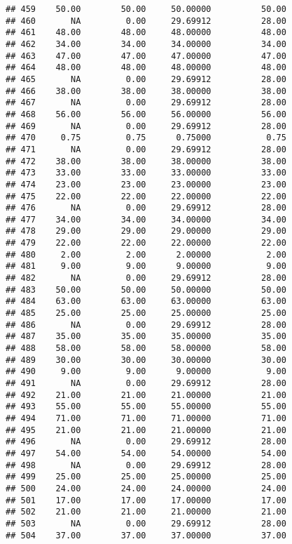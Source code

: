 \documentclass[
]{article}
\begin{document}
\begin{verbatim}
## 459    50.00        50.00     50.00000          50.00
## 460       NA         0.00     29.69912          28.00
## 461    48.00        48.00     48.00000          48.00
## 462    34.00        34.00     34.00000          34.00
## 463    47.00        47.00     47.00000          47.00
## 464    48.00        48.00     48.00000          48.00
## 465       NA         0.00     29.69912          28.00
## 466    38.00        38.00     38.00000          38.00
## 467       NA         0.00     29.69912          28.00
## 468    56.00        56.00     56.00000          56.00
## 469       NA         0.00     29.69912          28.00
## 470     0.75         0.75      0.75000           0.75
## 471       NA         0.00     29.69912          28.00
## 472    38.00        38.00     38.00000          38.00
## 473    33.00        33.00     33.00000          33.00
## 474    23.00        23.00     23.00000          23.00
## 475    22.00        22.00     22.00000          22.00
## 476       NA         0.00     29.69912          28.00
## 477    34.00        34.00     34.00000          34.00
## 478    29.00        29.00     29.00000          29.00
## 479    22.00        22.00     22.00000          22.00
## 480     2.00         2.00      2.00000           2.00
## 481     9.00         9.00      9.00000           9.00
## 482       NA         0.00     29.69912          28.00
## 483    50.00        50.00     50.00000          50.00
## 484    63.00        63.00     63.00000          63.00
## 485    25.00        25.00     25.00000          25.00
## 486       NA         0.00     29.69912          28.00
## 487    35.00        35.00     35.00000          35.00
## 488    58.00        58.00     58.00000          58.00
## 489    30.00        30.00     30.00000          30.00
## 490     9.00         9.00      9.00000           9.00
## 491       NA         0.00     29.69912          28.00
## 492    21.00        21.00     21.00000          21.00
## 493    55.00        55.00     55.00000          55.00
## 494    71.00        71.00     71.00000          71.00
## 495    21.00        21.00     21.00000          21.00
## 496       NA         0.00     29.69912          28.00
## 497    54.00        54.00     54.00000          54.00
## 498       NA         0.00     29.69912          28.00
## 499    25.00        25.00     25.00000          25.00
## 500    24.00        24.00     24.00000          24.00
## 501    17.00        17.00     17.00000          17.00
## 502    21.00        21.00     21.00000          21.00
## 503       NA         0.00     29.69912          28.00
## 504    37.00        37.00     37.00000          37.00

\end{verbatim}
\end{document}

